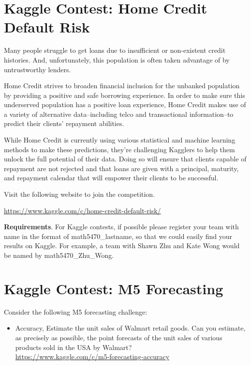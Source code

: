 \documentclass[11pt]{article}
\begin{document}
\newpage 


\section{Kaggle Contest: Home Credit Default Risk}

Many people struggle to get loans due to insufficient or non-existent credit histories. And, unfortunately, this population is often taken advantage of by untrustworthy lenders.

Home Credit strives to broaden financial inclusion for the unbanked population by providing a positive and safe borrowing experience. In order to make sure this underserved population has a positive loan experience, Home Credit makes use of a variety of alternative data--including telco and transactional information--to predict their clients' repayment abilities.

While Home Credit is currently using various statistical and machine learning methods to make these predictions, they're challenging Kagglers to help them unlock the full potential of their data. Doing so will ensure that clients capable of repayment are not rejected and that loans are given with a principal, maturity, and repayment calendar that will empower their clients to be successful.

Visit the following website to join the competition. 

\url{https://www.kaggle.com/c/home-credit-default-risk/}

{\bf Requirements}. For Kaggle contests, if possible please register your team with name in the format of math5470\_lastname, so that we could easily find your results on Kaggle. For example, a team with Shawn Zhu and Kate Wong would be named by math5470\_Zhu\_Wong.


\section{Kaggle Contest: M5 Forecasting}

Consider the following M5 forecasting challenge: 
\begin{itemize}
\item Accuracy, Estimate the unit sales of Walmart retail goods. Can you estimate, as precisely as possible, the point forecasts of the unit sales of various products sold in the USA by Walmart? \\
\url{https://www.kaggle.com/c/m5-forecasting-accuracy}
\end{itemize}
\end{document}
